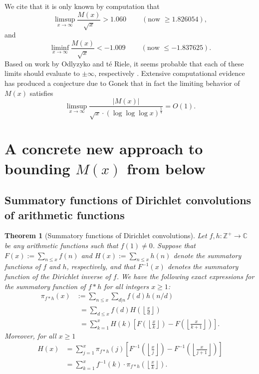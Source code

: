 \documentclass[11pt,reqno,a4letter]{article}
\numberwithin{figure}{section}
\numberwithin{table}{section}
\newcommand{\cf}{\textit{cf.\ }}
\newcommand{\seqnum}[1]{\href{http://oeis.org/#1}{\color{ProcessBlue}{\underline{#1}}}}
\newcommand{\Floor}[2]{\ensuremath{\left\lfloor \frac{#1}{#2} \right\rfloor}}
\theoremstyle{plain}
\newtheorem{theorem}{Theorem}
\numberwithin{theorem}{section}
\theoremstyle{definition}
\begin{document}
We cite that it is only known by computation 
that \cite[\cf \S 4.1]{PRIMEREC} 
\cite[\cf \seqnum{A051400}; \seqnum{A051401}]{OEIS} 
\[
\limsup_{x\rightarrow\infty} \frac{M(x)}{\sqrt{x}} > 1.060\ \qquad (\text{now } \geq 1.826054), 
\] 
and 
\[ 
\liminf_{x\rightarrow\infty} \frac{M(x)}{\sqrt{x}} < -1.009\ \qquad (\text{now } \leq -1.837625). 
\] 
Based on work by Odlyzyko and t\'{e} Riele, it seems probable that 
each of these limits should evaluate to $\pm \infty$, respectively 
\cite{ODLYZ-TRIELE,MREVISITED,ORDER-MERTENSFN,HURST-2017}. 
Extensive computational evidence has produced 
a conjecture due to Gonek that in fact the limiting behavior of 
$M(x)$ satisfies \cite{NG-MERTENS}
$$\limsup_{x \rightarrow \infty} \frac{|M(x)|}{\sqrt{x} \cdot (\log\log\log x)^{\frac{5}{4}}} = O(1).$$ 

\newpage 
\section{A concrete new approach to bounding $M(x)$ from below} 

\subsection{Summatory functions of Dirichlet convolutions of arithmetic functions} 

\begin{theorem}[Summatory functions of Dirichlet convolutions] 
\label{theorem_SummatoryFuncsOfDirCvls} 
Let $f,h: \mathbb{Z}^{+} \rightarrow \mathbb{C}$ be any arithmetic functions such that $f(1) \neq 0$. 
Suppose that $F(x) := \sum_{n \leq x} f(n)$ and $H(x) := \sum_{n \leq x} h(n)$ denote the summatory 
functions of $f$ and $h$, respectively, and that $F^{-1}(x)$ denotes the summatory function of the 
Dirichlet inverse of $f$. We have the following exact expressions for the 
summatory function of $f \ast h$ for all integers $x \geq 1$: 
\begin{align*} 
\pi_{f \ast h}(x) & := \sum_{n \leq x} \sum_{d|n} f(d) h(n/d) \\ 
     & \phantom{:}= \sum_{d \leq x} f(d) H\left(\Floor{x}{d}\right) \\ 
     & \phantom{:}= \sum_{k=1}^{x} H(k) \left[F\left(\Floor{x}{k}\right) - 
     F\left(\Floor{x}{k+1}\right)\right]. 
\end{align*} 
Moreover, for all $x \geq 1$ 
\begin{align*} 
H(x) & = \sum_{j=1}^{x} \pi_{f \ast h}(j) \left[F^{-1}\left(\Floor{x}{j}\right) - 
     F^{-1}\left(\Floor{x}{j+1}\right)\right] \\ 
     & = \sum_{k=1}^{x} f^{-1}(k) \cdot \pi_{f \ast h}\left(\Floor{x}{k}\right). 
\end{align*} 
\end{theorem} 
\end{document}
